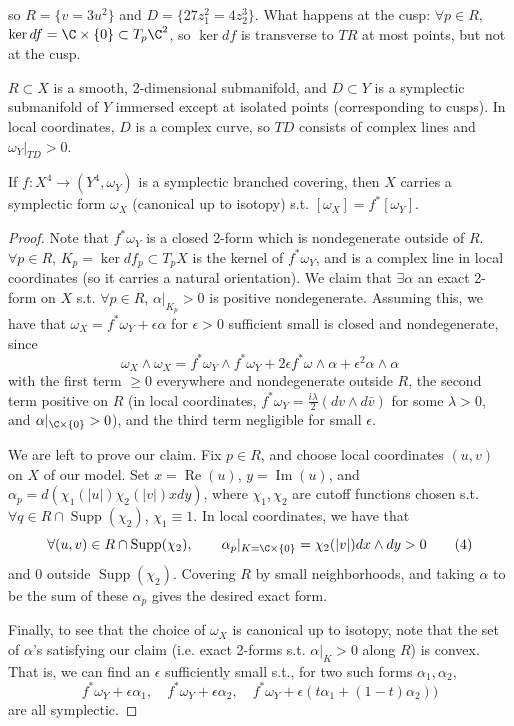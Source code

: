 so $R=\{v=3u^2\}$ and $D=\{27z_1^2=4z_2^3\}$. What happens at the cusp: $\forall p\in R$, $\ker df=\C\times\{0\}\subset T_p\C^2$, so $\ker df$ is transverse to $TR$ at most points, but not at the cusp.
\begin{lemma}[1]
$R\subset X$ is a smooth, 2-dimensional submanifold, and $D\subset Y$ is a symplectic submanifold of $Y$ immersed except at isolated points (corresponding to cusps). In local coordinates, $D$ is a complex curve, so $TD$ consists of complex lines and $\omega_Y|_{TD}>0$.
\end{lemma}
\begin{proposition}[1]
If $f:X^4\to(Y^4,\omega_Y)$ is a symplectic branched covering, then $X$ carries a symplectic form $\omega_X$ (canonical up to isotopy) s.t. $[\omega_X]=f^*[\omega_Y]$.
\end{proposition}
\begin{proof}
Note that $f^*\omega_Y$ is a closed 2-form which is nondegenerate outside of $R$. $\forall p\in R$, $K_p=\ker df_p\subset T_pX$ is the kernel of $f^*\omega_Y$, and is a complex line in local coordinates (so it carries a natural orientation). We claim that $\exists\alpha$ an exact 2-form on $X$ s.t. $\forall p\in R$, $\alpha|_{K_p}>0$ is positive nondegenerate. Assuming this, we have that $\omega_X=f^*\omega_Y+\epsilon\alpha$ for $\epsilon>0$ sufficient small is closed and nondegenerate, since
\[
\omega_X\wedge\omega_X=f^*\omega_Y\wedge f^*\omega_Y+2\epsilon f^*\omega\wedge\alpha+\epsilon^2\alpha\wedge\alpha\tag{3}
\]
with the first term $\geq0$ everywhere and nondegenerate outside $R$, the second term positive on $R$ (in local coordinates, $f^*\omega_Y=\frac{i\lambda}{2}(dv\wedge d\bar v)$ for some $\lambda>0$, and $\alpha|_{\C\times\{0\}}>0$), and the third term negligible for small $\epsilon$.

We are left to prove our claim. Fix $p\in R$, and choose local coordinates $(u,v)$ on $X$ of our model. Set $x=\operatorname{Re}(u)$, $y=\operatorname{Im}(u)$, and $\alpha_p=d(\chi_1(|u|)\chi_2(|v|)xdy)$, where $\chi_1,\chi_2$ are cutoff functions chosen s.t. $\forall q\in R\cap\operatorname{Supp}(\chi_2)$, $\chi_1\equiv1$. In local coordinates, we have that
\[
\forall(u,v)\in R\cap\operatorname{Supp}(\chi_2),\qquad
\alpha_p|_{K=\C\times\{0\}}=\chi_2(|v|)dx\wedge dy>0\tag{4}
\]
and $0$ outside $\operatorname{Supp}(\chi_2)$. Covering $R$ by small neighborhoods, and taking $\alpha$ to be the sum of these $\alpha_p$ gives the desired exact form.

Finally, to see that the choice of $\omega_X$ is canonical up to isotopy, note that the set of $\alpha$'s satisfying our claim (i.e. exact 2-forms s.t. $\alpha|_K>0$ along $R$) is convex. That is, we can find an $\epsilon$ sufficiently small s.t., for two such forms $\alpha_1,\alpha_2$,
\[
f^*\omega_Y+\epsilon\alpha_1,\quad f^*\omega_Y+\epsilon\alpha_2,\quad
f^*\omega_Y+\epsilon(t\alpha_1+(1-t)\alpha_2))\tag{5}
\]
are all symplectic.
\end{proof}